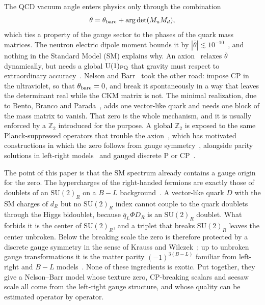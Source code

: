 \documentclass[submission, Phys]{SciPost}
\newcommand{\SU}{\mathrm{SU}}
\newcommand{\U}{\mathrm{U}}
\newcommand{\Z}{\mathbb{Z}}
\newcommand{\bt}{\bar\theta}
\begin{document}
The QCD vacuum angle enters physics only through the combination
\begin{equation}
  \bt = \theta_{\rm bare} + \arg\det(M_uM_d),
  \label{eq:bartheta}
\end{equation}
which ties a property of the gauge sector to the phases of the quark
mass matrices. The neutron electric dipole moment bounds it by
$|\bt|\lesssim10^{-10}$~\cite{Abel_2020:PRL}, and nothing in the
Standard Model (SM) explains why. An axion~\cite{Peccei_1977:PRL,Peccei_1977:PRD}
relaxes $\bt$ dynamically, but needs a global $\U(1)_{\rm PQ}$ that
gravity must respect to extraordinary
accuracy~\cite{Kamionkowski:1992mf,Holman:1992us,Barr:1992qq}.
Nelson and Barr~\cite{Nelson1984NaturallyWC,Barr:1984qx} took the other
road: impose CP in the ultraviolet, so that $\theta_{\rm bare}=0$, and
break it spontaneously in a way that leaves the determinant real while
the CKM matrix is not. The minimal realization, due to Bento, Branco
and Parada~\cite{BENTO199195}, adds one vector-like quark and needs one
block of the mass matrix to vanish. That zero is the whole mechanism,
and it is usually enforced by a $\Z_2$ introduced for the purpose. A
global $\Z_2$ is exposed to the same Planck-suppressed operators that
trouble the axion~\cite{Dine:2015jga}, which has motivated
constructions in which the zero follows from gauge
symmetry~\cite{asadi_2023:PRD,Perez:2023zin,Murgui:2025scx,Murgui:2026wim},
alongside parity solutions in left-right
models~\cite{Babu:1989rb,Hall:2018let} and gauged discrete P or
CP~\cite{Benabou:2025clr}.

The point of this paper is that the SM spectrum already contains a
gauge origin for the zero. The hypercharges of the right-handed
fermions are exactly those of doublets of an $\SU(2)_R$ on a $B-L$
background~\cite{Pati_1974:PRD,Mohapatra:1974gc,Senjanovic_1975:PRD}.
A vector-like quark $D$ with the SM charges of $d_R$ but no $\SU(2)_R$
index cannot couple to the quark doublets through the Higgs bidoublet,
because $\bar q_L\Phi D_R$ is an $\SU(2)_R$ doublet. What forbids it is
the center of $\SU(2)_R$, and a triplet that breaks $\SU(2)_R$ leaves
the center unbroken. Below the breaking scale the zero is therefore
protected by a discrete gauge symmetry in the sense of Krauss and
Wilczek~\cite{krauss_1989:PRL,Banks:2010zn}; up to unbroken gauge
transformations it is the matter parity $(-1)^{3(B-L)}$ familiar from
left-right and $B-L$ models~\cite{Ibanez:1991hv,Martin:1992mq}. None of
these ingredients is exotic. Put together, they give a Nelson--Barr
model whose texture zero, CP-breaking scalars and seesaw scale all come
from the left-right gauge structure, and whose quality can be
estimated operator by operator.
\end{document}
